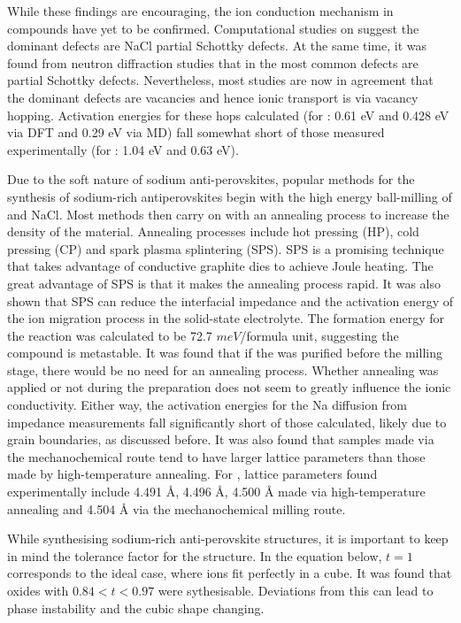 \documentclass[10pt,a4paper, titlepage]{article}
\begin{document}
While these findings are encouraging, the ion conduction mechanism in  compounds have yet to be confirmed. 
Computational studies on  suggest the dominant defects are NaCl partial Schottky defects. \cite{RN55, RN72}
At the same time, it was found from neutron diffraction studies that in  the most common defects are  partial Schottky defects. \cite{RN66}
Nevertheless, most studies are now in agreement that the dominant  defects are vacancies and hence ionic transport is via vacancy hopping.
Activation energies for these hops calculated (for : 0.61 eV\cite{RN72} and 0.428 eV\cite{RN68} via DFT and 0.29 eV\cite{RN53} via MD) fall somewhat short of those measured experimentally (for : 1.04 eV\cite{RN53} and 0.63 eV\cite{RN68, RN55}).

Due to the soft nature of sodium anti-perovskites, popular methods for the synthesis of sodium-rich antiperovskites begin with the high energy ball-milling of  and NaCl.
Most methods then carry on with an annealing process to increase the density of the material.
Annealing processes include hot pressing (HP), cold pressing (CP) and spark plasma splintering (SPS).
SPS is a promising technique that takes advantage of conductive graphite dies to achieve Joule heating.
The great advantage of SPS is that it makes the annealing process rapid.
It was also shown that SPS can reduce the interfacial impedance and the activation energy of the ion migration process in the solid-state electrolyte. \cite{RN79}
The formation energy for the reaction was calculated to be 72.7 $meV$/formula unit, suggesting the compound is metastable. \cite{RN72}
It was found that if the  was purified before the milling stage, there would be no need for an annealing process. \cite{RN53}
Whether annealing was applied or not during the preparation does not seem to greatly influence the ionic conductivity. \cite{RN53, RN79}
Either way, the activation energies for the Na diffusion from impedance measurements fall significantly short of those calculated, likely due to  grain boundaries, as discussed before.
It was also found that samples made via the mechanochemical route tend to have larger lattice parameters than those made by high-temperature annealing. \cite{RN53}
For , lattice parameters found experimentally include 4.491 \AA\cite{RN68}, 4.496 \AA\cite{RN69}, 4.500 \AA\cite{RN65} made via high-temperature annealing and 4.504 \AA\cite{RN53} via the mechanochemical milling route. 

While synthesising sodium-rich anti-perovskite structures, it is important to keep in mind the tolerance factor for the structure. 
In the equation below, $t = 1$ corresponds to the ideal case, where ions fit perfectly in a cube. 
It was found that oxides with $0.84 < t < 0.97$ were sythesisable. 
Deviations from this can lead to phase instability and the cubic shape changing. \cite{RN53}
\end{document}
